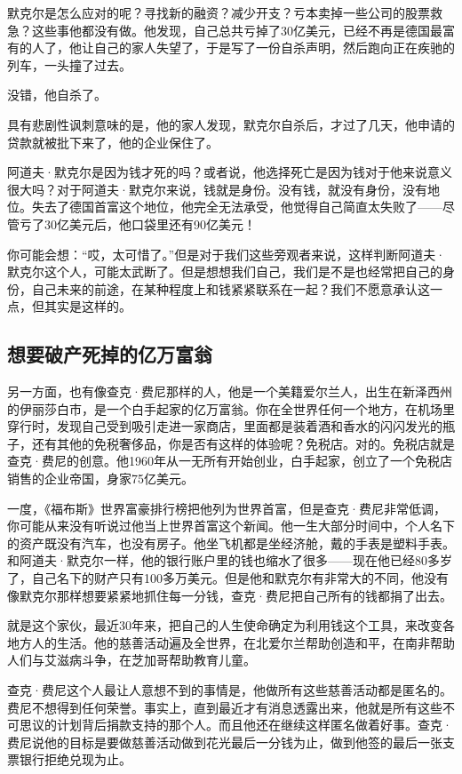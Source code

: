 默克尔是怎么应对的呢？寻找新的融资？减少开支？亏本卖掉一些公司的股票救急？这些事他都没有做。他发现，自己总共亏掉了30亿美元，已经不再是德国最富有的人了，他让自己的家人失望了，于是写了一份自杀声明，然后跑向正在疾驰的列车，一头撞了过去。

没错，他自杀了。

具有悲剧性讽刺意味的是，他的家人发现，默克尔自杀后，才过了几天，他申请的贷款就被批下来了，他的企业保住了。

阿道夫·默克尔是因为钱才死的吗？或者说，他选择死亡是因为钱对于他来说意义很大吗？对于阿道夫·默克尔来说，钱就是身份。没有钱，就没有身份，没有地位。失去了德国首富这个地位，他完全无法承受，他觉得自己简直太失败了——尽管亏了30亿美元后，他口袋里还有90亿美元！

你可能会想：“哎，太可惜了。”但是对于我们这些旁观者来说，这样判断阿道夫·默克尔这个人，可能太武断了。但是想想我们自己，我们是不是也经常把自己的身份，自己未来的前途，在某种程度上和钱紧紧联系在一起？我们不愿意承认这一点，但其实是这样的。

\subsection{想要破产死掉的亿万富翁}

另一方面，也有像查克·费尼那样的人，他是一个美籍爱尔兰人，出生在新泽西州的伊丽莎白市，是一个白手起家的亿万富翁。你在全世界任何一个地方，在机场里穿行时，发现自己受到吸引走进一家商店，里面都是装着酒和香水的闪闪发光的瓶子，还有其他的免税奢侈品，你是否有这样的体验呢？免税店。对的。免税店就是查克·费尼的创意。他1960年从一无所有开始创业，白手起家，创立了一个免税店销售的企业帝国，身家75亿美元。

一度，《福布斯》世界富豪排行榜把他列为世界首富，但是查克·费尼非常低调，你可能从来没有听说过他当上世界首富这个新闻。他一生大部分时间中，个人名下的资产既没有汽车，也没有房子。他坐飞机都是坐经济舱，戴的手表是塑料手表。和阿道夫·默克尔一样，他的银行账户里的钱也缩水了很多——现在他已经80多岁了，自己名下的财产只有100多万美元。但是他和默克尔有非常大的不同，他没有像默克尔那样想要紧紧地抓住每一分钱，查克·费尼把自己所有的钱都捐了出去。

就是这个家伙，最近30年来，把自己的人生使命确定为利用钱这个工具，来改变各地方人的生活。他的慈善活动遍及全世界，在北爱尔兰帮助创造和平，在南非帮助人们与艾滋病斗争，在芝加哥帮助教育儿童。

查克·费尼这个人最让人意想不到的事情是，他做所有这些慈善活动都是匿名的。费尼不想得到任何荣誉。事实上，直到最近才有消息透露出来，他就是所有这些不可思议的计划背后捐款支持的那个人。而且他还在继续这样匿名做着好事。查克·费尼说他的目标是要做慈善活动做到花光最后一分钱为止，做到他签的最后一张支票银行拒绝兑现为止。

